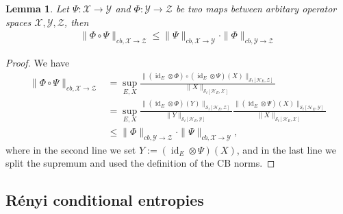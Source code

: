 \documentclass[11pt]{article}
\DeclareMathOperator{\id}{id}
\newcommand{\1}{\ensuremath{\mathbbm{1}}}
\theoremstyle{newdefinition}
\theoremstyle{newplain}
\newtheorem{lemma}[definition]{Lemma}
\theoremstyle{myplain}
\begin{document}
\begin{lemma}\label{lem:cb.norm.splitting}
Let $\Psi:\mathcal{X}\to\mathcal{Y}$ and $\Phi:\mathcal{Y}\to\mathcal{Z}$ be two maps between arbitary operator spaces $\mathcal{X},\mathcal{Y},\mathcal{Z}$, then
\begin{align}
\|\Phi\circ\Psi\|_{cb,\mathcal{X}\to\mathcal{Z}} \leq \|\Psi\|_{cb,\mathcal{X}\to \mathcal{Y}}\cdot \|\Phi\|_{cb,\mathcal{Y}\to \mathcal{Z}}
\end{align}
\end{lemma}
\begin{proof}
We have
    \begin{align}   \|\Phi\circ\Psi\|_{cb,\mathcal{X}\to\mathcal{Z}} &= \sup_{E,X}\frac{\|(\id_E\otimes\Phi)\circ(\id_E\otimes\Psi)(X)\|_{\mathcal{S}_t[\mathcal{H}_E,\mathcal{Z}]}}{\|X\|_{\mathcal{S}_t[\mathcal{H}_E,\mathcal{X}]}} \\
   &= \sup_{E,X}\frac{\|(\id_E\otimes\Phi)(Y)\|_{\mathcal{S}_t[\mathcal{H}_E,\mathcal{Z}]}}{\|Y\|_{\mathcal{S}_t[\mathcal{H}_E,\mathcal{Y}]}} \frac{\|(\id_E\otimes \Psi)(X)\|_{\mathcal{S}_t[\mathcal{H}_E,\mathcal{Y}]}}{\|X\|_{\mathcal{S}_t[\mathcal{H}_E,\mathcal{X}]}} \\
   &\leq \|\Phi\|_{cb,\mathcal{Y}\to\mathcal{Z}} \cdot \|\Psi\|_{cb,\mathcal{X}\to\mathcal{Y}} ,
    \end{align} where in the second line we set $Y:=(\id_E\otimes\Psi)(X)$, and in the last line we split the supremum and used the definition of the CB norms.
\end{proof}


\subsection{R\'{e}nyi conditional entropies}\label{renyidefs}
\end{document}
